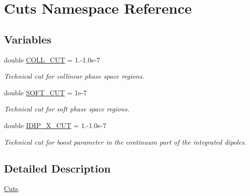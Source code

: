 \hypertarget{namespaceCuts}{\section{Cuts Namespace Reference}
\label{namespaceCuts}
}
\subsection*{Variables}
\begin{DoxyCompactItemize}
\item 
\hypertarget{namespaceCuts_aac32d5f86a762f4aeb4f5f07a9accdba}{double \hyperlink{namespaceCuts_aac32d5f86a762f4aeb4f5f07a9accdba}{C\-O\-L\-L\-\_\-\-C\-U\-T} = 1.-\/1.\-0e-\/7}\label{namespaceCuts_aac32d5f86a762f4aeb4f5f07a9accdba}

\begin{DoxyCompactList}\small\item\em Technical cut for collinear phase space regions. \end{DoxyCompactList}\item 
\hypertarget{namespaceCuts_ab5b6f8f12059d55ffb68f56fecc10d65}{double \hyperlink{namespaceCuts_ab5b6f8f12059d55ffb68f56fecc10d65}{S\-O\-F\-T\-\_\-\-C\-U\-T} = 1e-\/7}\label{namespaceCuts_ab5b6f8f12059d55ffb68f56fecc10d65}

\begin{DoxyCompactList}\small\item\em Technical cut for soft phase space regions. \end{DoxyCompactList}\item 
\hypertarget{namespaceCuts_a4a86c8447ab5c08303431898f6faae38}{double \hyperlink{namespaceCuts_a4a86c8447ab5c08303431898f6faae38}{I\-D\-I\-P\-\_\-\-X\-\_\-\-C\-U\-T} = 1.-\/1.\-0e-\/7}\label{namespaceCuts_a4a86c8447ab5c08303431898f6faae38}

\begin{DoxyCompactList}\small\item\em Technical cut for boost parameter in the continuum part of the integrated dipoles. \end{DoxyCompactList}\end{DoxyCompactItemize}


\subsection{Detailed Description}
\hyperlink{namespaceCuts}{Cuts}. 
